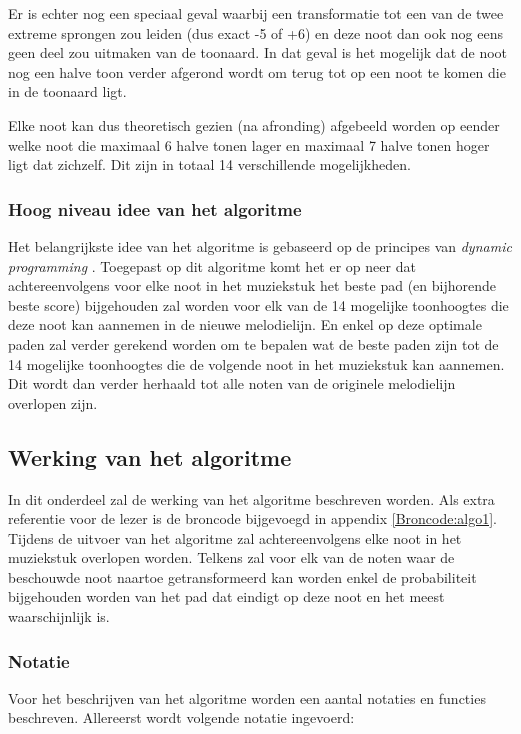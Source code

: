 Er is echter nog een speciaal geval waarbij een transformatie tot een van de twee extreme sprongen zou leiden (dus exact -5 of +6) en deze noot dan ook nog eens geen deel zou uitmaken van de toonaard. In dat geval is het mogelijk dat de noot nog een halve toon verder afgerond wordt om terug tot op een noot te komen die in de toonaard ligt.

Elke noot kan dus theoretisch gezien (na afronding) afgebeeld worden op eender welke noot die maximaal 6 halve tonen lager en maximaal 7 halve tonen hoger ligt dat zichzelf. Dit zijn in totaal 14 verschillende mogelijkheden.

\subsubsection{Hoog niveau idee van het algoritme}
Het belangrijkste idee van het algoritme is gebaseerd op de principes van \textit{dynamic programming} \cite{url:DP}. Toegepast op dit algoritme komt het er op neer dat achtereenvolgens voor elke noot in het muziekstuk het beste pad (en bijhorende beste score) bijgehouden zal worden voor elk van de 14 mogelijke toonhoogtes die deze noot kan aannemen in de nieuwe melodielijn. En enkel op deze optimale paden zal verder gerekend worden om te bepalen wat de beste paden zijn tot de 14 mogelijke toonhoogtes die de volgende noot in het muziekstuk kan aannemen. Dit wordt dan verder herhaald tot alle noten van de originele melodielijn overlopen zijn.

\subsection{Werking van het algoritme}
In dit onderdeel zal de werking van het algoritme beschreven worden. Als extra referentie voor de lezer is de broncode bijgevoegd in appendix \ref{Broncode:algo1}. Tijdens de uitvoer van het algoritme zal achtereenvolgens elke noot in het muziekstuk overlopen worden. Telkens zal voor elk van de noten waar de beschouwde noot naartoe getransformeerd kan worden enkel de probabiliteit bijgehouden worden van het pad dat eindigt op deze noot en het meest waarschijnlijk is.

\subsubsection{Notatie}
Voor het beschrijven van het algoritme worden een aantal notaties en functies beschreven. Allereerst wordt volgende notatie ingevoerd:


